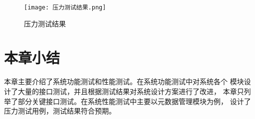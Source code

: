 \begin{figure}[H]
  \centering
  \texttt{[image: 压力测试结果.png]}
  \caption{压力测试结果}
  \label{fig:badge2}
\end{figure}

\section{本章小结}

本章主要介绍了系统功能测试和性能测试。在系统功能测试中对系统各个
模块设计了大量的接口测试，并且根据测试结果对系统设计方案进行了改进，
本章只列举了部分关键接口测试。在系统性能测试中主要以元数据管理模块为例，
设计了压力测试用例，测试结果符合预期。
